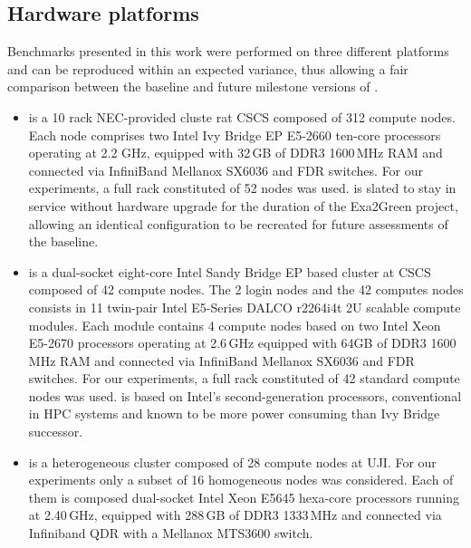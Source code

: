 \subsection{Hardware platforms}
\label{subsec:3.1}

Benchmarks presented  in this work  were performed on  three different
platforms  and can  be reproduced  within an  expected  variance, thus
allowing a  fair comparison between the baseline  and future milestone
versions of \cosmoart.

\begin{itemize}
\item \monch is a 10 rack NEC-provided cluste rat CSCS composed
  of 312 compute  nodes. %
  Each node comprises two Intel Ivy Bridge EP  E5-2660 ten-core processors
  operating at  2.2 GHz, equipped with 32\,GB of DDR3 1600\,MHz  RAM and connected  via InfiniBand Mellanox  SX6036 and FDR switches. For our  experiments, 
  a full rack constituted of 52 nodes was used. \monch is  slated to stay
  in  service  without  hardware  upgrade  for  the  duration  of  the
  Exa2Green  project,  allowing   an  identical  configuration  to  be
  recreated for future assessments of the baseline.\\

\item \pilat is a dual-socket eight-core Intel Sandy
  Bridge EP based cluster at  CSCS composed of 42 compute nodes. %
  The 2 login  nodes and
  the 42 computes nodes consists in 11 twin-pair Intel E5-Series DALCO
  r2264i4t 2U scalable compute modules. Each module contains 4 compute
  nodes based  on two Intel Xeon E5-2670 processors operating  at 2.6\,GHz equipped with 64GB of DDR3 1600\,MHz RAM and connected  via InfiniBand Mellanox SX6036 and FDR switches. 
  For our  experiments, a  full rack constituted  of 42 standard  compute nodes
  was used. \pilat  is based  on  Intel's second-generation
  processors, conventional in  HPC systems and known to  be more power
  consuming than Ivy Bridge successor.\\

\item \tinto is  a heterogeneous cluster composed of
  28 compute nodes at UJI. For our  experiments only a subset of 16 homogeneous nodes was considered. Each of them is composed dual-socket Intel Xeon E5645 hexa-core processors 
  running at 2.40\,GHz, equipped with 288\,GB  of DDR3 1333\,MHz and connected via Infiniband QDR with a Mellanox MTS3600 switch. 

\end{itemize}

